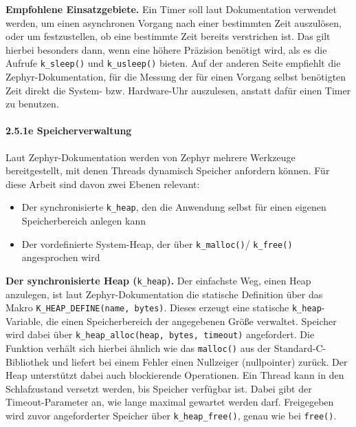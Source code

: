 \textbf{Empfohlene Einsatzgebiete.} Ein Timer soll laut Dokumentation verwendet werden, um einen asynchronen Vorgang nach einer bestimmten Zeit auszul{\"o}sen, oder um festzustellen, ob eine bestimmte Zeit bereits verstrichen ist. Das gilt hierbei besonders dann, wenn eine h{\"o}here Pr{\"a}zision ben{\"o}tigt wird, als es die Aufrufe \lstinline[style=fileinline]|k_sleep()| und \lstinline[style=fileinline]|k_usleep()| bieten. Auf der anderen Seite empfiehlt die Zephyr-Dokumentation, f{\"u}r die Messung der f{\"u}r einen Vorgang selbst ben{\"o}tigten Zeit direkt die System- bzw. Hardware-Uhr auszulesen, anstatt daf{\"u}r einen Timer zu benutzen.

\paragraph*{\textbf{2.5.1e Speicherverwaltung}}
Laut Zephyr-Dokumentation werden von Zephyr mehrere Werkzeuge bereitgestellt, mit denen Threads dynamisch Speicher anfordern k{\"o}nnen. F{\"u}r diese Arbeit sind davon zwei Ebenen relevant:

\begin{itemize}
\item Der synchronisierte \lstinline[style=fileinline]|k_heap|, den die Anwendung selbst f{\"u}r einen eigenen Speicherbereich anlegen kann
\item Der vordefinierte System-Heap, der {\"u}ber \lstinline[style=fileinline]|k_malloc()|/ \lstinline[style=fileinline]|k_free()| angesprochen wird
\end{itemize}
\textbf{Der synchronisierte Heap (}\lstinline[style=fileinline]|k_heap|\textbf{).} Der einfachste Weg, einen Heap anzulegen, ist laut Zephyr-Dokumentation die statische Definition {\"u}ber das Makro \lstinline[style=fileinline]|K_HEAP_DEFINE(name, bytes)|. Dieses erzeugt eine statische \lstinline[style=fileinline]|k_heap|-Variable, die einen Speicherbereich der angegebenen Gr{\"o}{\ss}e verwaltet. Speicher wird dabei {\"u}ber \lstinline[style=fileinline]|k_heap_alloc(heap, bytes, timeout)| angefordert. Die Funktion verh{\"a}lt sich hierbei {\"a}hnlich wie das \lstinline[style=fileinline]|malloc()| aus der Standard-C-Bibliothek und liefert bei einem Fehler einen Nullzeiger (nullpointer) zur{\"u}ck. Der Heap unterst{\"u}tzt dabei auch blockierende Operationen. Ein Thread kann in den Schlafzustand versetzt werden, bis Speicher verf{\"u}gbar ist. Dabei gibt der Timeout-Parameter an, wie lange maximal gewartet werden darf. Freigegeben wird zuvor angeforderter Speicher {\"u}ber \lstinline[style=fileinline]|k_heap_free()|, genau wie bei \lstinline[style=fileinline]|free()|.

